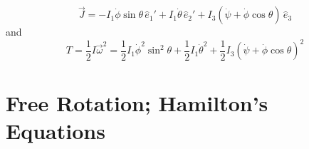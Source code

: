\documentclass[../notes.tex]{subfiles}
\begin{document}
\begin{itemize}
\begin{itemize}
        \begin{equation*}
            \vec{J} = -I_1\dot{\phi}\sin\theta\,\hat{e}_1'+I_1\dot{\theta}\,\hat{e}_2'+I_3(\dot{\psi}+\dot{\phi}\cos\theta)\,\hat{e}_3
        \end{equation*}
        and
        \begin{equation*}
            T = \frac{1}{2}I\vec{\omega}^2
            = \frac{1}{2}I_1\dot{\phi}^2\sin^2\theta+\frac{1}{2}I_1\dot{\theta}^2+\frac{1}{2}I_3(\dot{\psi}+\dot{\phi}\cos\theta)^2
        \end{equation*}
    \end{itemize}
\end{itemize}



\section{Free Rotation; Hamilton's Equations}
\end{document}

